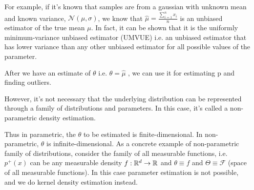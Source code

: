 \documentclass[11pt]{report}
\begin{document}
    For example, if it's known that samples are from a gaussian with unknown mean and known variance, $\mathcal{N}(\mu, \sigma)$, we know that $\hat{\mu}
    = \frac{\sum _{i=1} ^n x_i}{n}$ is an unbiased estimator of the true mean $\mu$. In fact, it can be shown that it is the uniformly minimum-variance unbiased estimator (UMVUE) i.e. an unbiased estimator that has lower variance than any other unbiased estimator for all possible values of the parameter.

    After we have an estimate of $\theta$ i.e. $\hat{\theta} = \hat{\mu}$ , we can use it for estimating p and finding outliers. 

    However, it's not necessary that the underlying distribution can be represented through a family of distributions and parameters. In this case, it's called a non-parametric density estimation. 
    
Thus in parametric, the $\theta$ to be estimated is finite-dimensional. In non-parametric, $\theta$ is infinite-dimensional. As a concrete example of non-parametric family of distributions, consider the family of all measurable functions, i.e. $p^+(x)$ can be any measurable density $f: \mathbb{R}^d \rightarrow \mathbb{R}$ and $\theta \equiv f$ and $\Theta \equiv \mathcal{F}$ (space of all measurable functions). In this case parameter estimation is not possible, and we do kernel density estimation instead.
\end{document}
